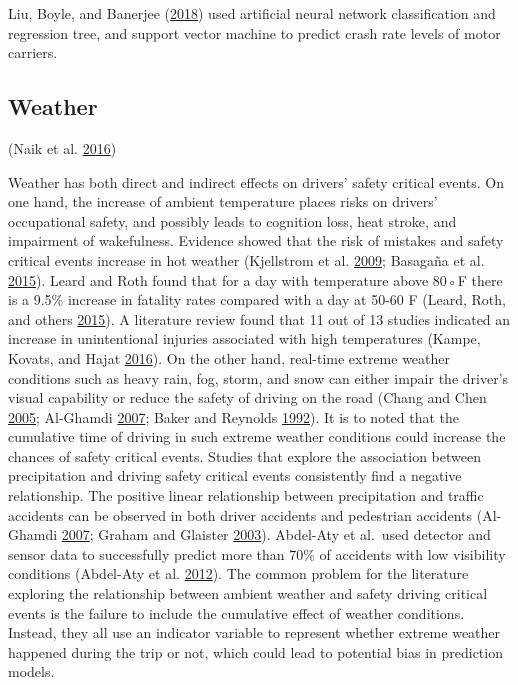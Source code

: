 \documentclass[12pt]{book}
\numberwithin{equation}{chapter}
\begin{document}
Liu, Boyle, and Banerjee (\protect\hyperlink{ref-liu2018predicting}{2018}) used artificial neural network classification and regression tree, and support vector machine to predict crash rate levels of motor carriers.

\hypertarget{weather}{%
\subsection{Weather}\label{weather}}

(Naik et al. \protect\hyperlink{ref-naik2016weather}{2016})

Weather has both direct and indirect effects on drivers' safety critical events. On one hand, the increase of ambient temperature places risks on drivers' occupational safety, and possibly leads to cognition loss, heat stroke, and impairment of wakefulness. Evidence showed that the risk of mistakes and safety critical events increase in hot weather (Kjellstrom et al. \protect\hyperlink{ref-kjellstrom2009direct}{2009}; Basagaña et al. \protect\hyperlink{ref-basagana2015high}{2015}). Leard and Roth found that for a day with temperature above 80◦F there is a 9.5\% increase in fatality rates compared with a day at 50-60 F (Leard, Roth, and others \protect\hyperlink{ref-leard2015weather}{2015}). A literature review found that 11 out of 13 studies indicated an increase in unintentional injuries associated with high temperatures (Kampe, Kovats, and Hajat \protect\hyperlink{ref-im2016impact}{2016}). On the other hand, real-time extreme weather conditions such as heavy rain, fog, storm, and snow can either impair the driver's visual capability or reduce the safety of driving on the road (Chang and Chen \protect\hyperlink{ref-chang2005data}{2005}; Al-Ghamdi \protect\hyperlink{ref-al2007experimental}{2007}; Baker and Reynolds \protect\hyperlink{ref-baker1992wind}{1992}). It is to noted that the cumulative time of driving in such extreme weather conditions could increase the chances of safety critical events. Studies that explore the association between precipitation and driving safety critical events consistently find a negative relationship. The positive linear relationship between precipitation and traffic accidents can be observed in both driver accidents and pedestrian accidents (Al-Ghamdi \protect\hyperlink{ref-al2007experimental}{2007}; Graham and Glaister \protect\hyperlink{ref-graham2003spatial}{2003}). Abdel-Aty et al.~used detector and sensor data to successfully predict more than 70\% of accidents with low visibility conditions (Abdel-Aty et al. \protect\hyperlink{ref-abdel2012real}{2012}). The common problem for the literature exploring the relationship between ambient weather and safety driving critical events is the failure to include the cumulative effect of weather conditions. Instead, they all use an indicator variable to represent whether extreme weather happened during the trip or not, which could lead to potential bias in prediction models.
\end{document}

